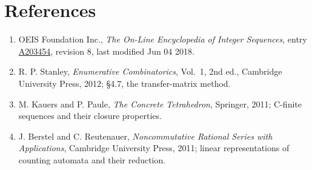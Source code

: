 \documentclass[11pt]{article}
\theoremstyle{definition}
\begin{document}
\section{References}

\begin{enumerate}

\item OEIS Foundation Inc., \emph{The On-Line Encyclopedia of Integer Sequences}, entry \href{https://oeis.org/A203454}{A203454}, revision 8, last modified Jun 04 2018.

\item R. P. Stanley, \emph{Enumerative Combinatorics}, Vol.~1, 2nd ed., Cambridge University Press, 2012; \S4.7, the transfer-matrix method.

\item M. Kauers and P. Paule, \emph{The Concrete Tetrahedron}, Springer, 2011; C-finite sequences and their closure properties.

\item J. Berstel and C. Reutenauer, \emph{Noncommutative Rational Series with Applications}, Cambridge University Press, 2011; linear representations of counting automata and their reduction.

\end{enumerate}
\end{document}
